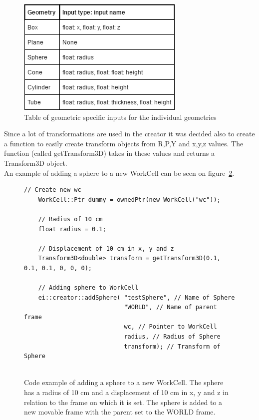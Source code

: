 \begin{figure}[h]
	\centering
	\includegraphics[scale=0.55]{Figures/InputsForGeoms.png}
	\caption{Table of geometric specific inputs for the individual geometries}
	\label{fig:InputsForGeoms}
\end{figure}

Since a lot of transformations are used in the creator it was decided also to create a function to easily create transform objects from R,P,Y and x,y,z values. The function (called getTransform3D) takes in these values and returns a Transform3D object.\\

An example of adding a sphere to a new WorkCell can be seen on figure~\ref{fig:CodeExampleAddSphere}.

\begin{figure}[h]
	\centering
	\lstset{language=C++} 
	\begin{lstlisting}[frame=single]
	// Create new wc
	WorkCell::Ptr dummy = ownedPtr(new WorkCell("wc"));
	 
	// Radius of 10 cm
	float radius = 0.1;
	
	// Displacement of 10 cm in x, y and z
	Transform3D<double> transform = getTransform3D(0.1, 0.1, 0.1, 0, 0, 0); 
	
	// Adding sphere to WorkCell
	ei::creator::addSphere( "testSphere", // Name of Sphere
							"WORLD", // Name of parent frame
							wc, // Pointer to WorkCell
							radius, // Radius of Sphere
							transform); // Transform of Sphere
	 
	\end{lstlisting}
	\caption{Code example of adding a sphere to a new WorkCell. The sphere has a radius of 10 cm and a displacement of 10 cm in x, y and z in relation to the frame on which it is set. The sphere is added to a new movable frame with the parent set to the WORLD frame.}
	\label{fig:CodeExampleAddSphere}
\end{figure}

